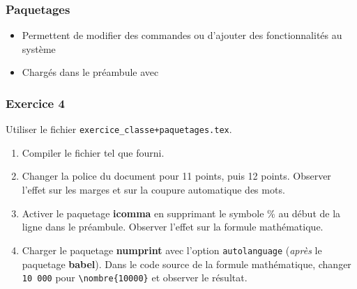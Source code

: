 
\begin{frame}[c,fragile]

	\frametitle{Paquetages}
	
	\begin{itemize}
		\item Permettent de modifier des commandes ou d’ajouter des	fonctionnalités au système
		\item Chargés dans le préambule avec
		
	\begin{codesource}
	\usepackage{paquetage}
	\usepackage[options]{paquetage}
	\usepackage{paquetage1,paquetage2,...}
	\end{codesource}
	\end{itemize}
\end{frame}


\begin{frame}[fragile]

	\frametitle{Exercice 4}
	
	Utiliser le fichier \texttt{exercice\_classe+paquetages.tex}.
	
	\begin{enumerate}
		\item Compiler le fichier tel que fourni.
		\item Changer la police du document pour 11 points, puis 12 points.
		Observer l’effet sur les marges et sur la coupure automatique
		des mots.
		\item Activer le paquetage \textbf{icomma} en supprimant le symbole \% au
		début de la ligne dans le préambule. Observer l’effet sur la
		formule mathématique.
		\item Charger le paquetage \textbf{numprint} avec l’option \texttt{autolanguage}
		(\emph{après} le paquetage \textbf{babel}). Dans le code source de la formule
		mathématique, changer \texttt{10 000} pour \texttt{\textbackslash nombre\{10000\}}
		et observer le résultat.
	\end{enumerate}

\end{frame}


